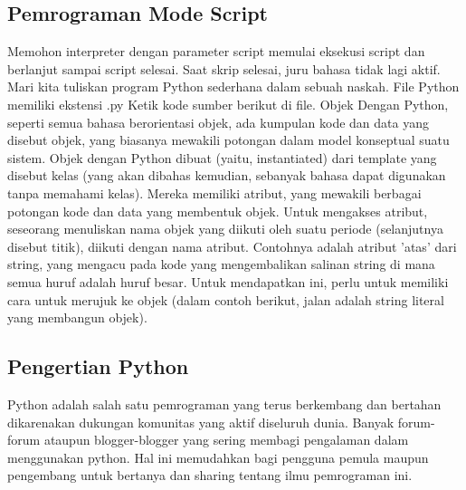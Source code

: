 \subsection{Pemrograman Mode Script}
Memohon interpreter dengan parameter script memulai eksekusi script dan berlanjut sampai script selesai. Saat skrip selesai, juru bahasa tidak lagi aktif. Mari kita tuliskan program Python sederhana dalam sebuah naskah. File Python memiliki ekstensi .py  Ketik kode sumber berikut di ﬁle.
Objek Dengan Python, seperti semua bahasa berorientasi objek, ada kumpulan kode dan data yang disebut objek, yang biasanya mewakili potongan dalam model konseptual suatu sistem. Objek dengan Python dibuat (yaitu, instantiated) dari template yang disebut kelas (yang akan dibahas kemudian, sebanyak bahasa dapat digunakan tanpa memahami kelas). Mereka memiliki atribut, yang mewakili berbagai potongan kode dan data yang membentuk objek. Untuk mengakses atribut, seseorang menuliskan nama objek yang diikuti oleh suatu periode (selanjutnya disebut titik), diikuti dengan nama atribut.
Contohnya adalah atribut ’atas’ dari string, yang mengacu pada kode yang mengembalikan salinan string di mana semua huruf adalah huruf besar. Untuk mendapatkan ini, perlu untuk memiliki cara untuk merujuk ke objek (dalam contoh berikut, jalan adalah string literal yang membangun objek).

\subsection{Pengertian Python}
Python adalah salah satu pemrograman yang terus berkembang dan bertahan dikarenakan dukungan komunitas yang aktif diseluruh dunia. Banyak forum-forum ataupun blogger-blogger yang sering membagi pengalaman dalam menggunakan python. Hal ini memudahkan bagi pengguna pemula maupun pengembang untuk bertanya dan sharing tentang ilmu pemrograman ini. 

